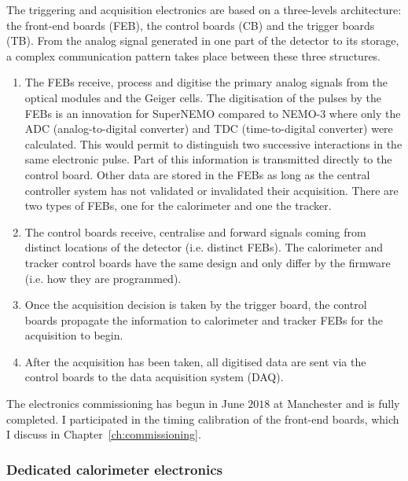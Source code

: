 The triggering and acquisition electronics are based on a three-levels architecture: the front-end boards (FEB), the control boards (CB) and the trigger boards (TB).
From the analog signal generated in one part of the detector to its storage, a complex communication pattern takes place between these three structures.
\begin{enumerate}
\item The FEBs receive, process and digitise the primary analog signals from the optical modules and the Geiger cells.
  The digitisation of the pulses by the FEBs is an innovation for SuperNEMO compared to NEMO-$3$ where only the ADC (analog-to-digital converter) and TDC (time-to-digital converter) were calculated.
  This would permit to distinguish two successive interactions in the same electronic pulse.
  Part of this information is transmitted directly to the control board.
  Other data are stored in the FEBs as long as the central controller system has not validated or invalidated their acquisition.
  There are two types of FEBs, one for the calorimeter and one the tracker.
\item The control boards receive, centralise and forward signals coming from distinct locations of the detector (i.e. distinct FEBs).
  The calorimeter and tracker control boards have the same design and only differ by the firmware (i.e. how they are programmed).
\item Once the acquisition decision is taken by the trigger board, the control boards propagate the information to calorimeter and tracker FEBs for the acquisition to begin.
\item After the acquisition has been taken, all digitised data are sent via the control boards to the data acquisition system (DAQ).
\end{enumerate}
The electronics commissioning has begun in June $2018$ at Manchester and is fully completed.
I participated in the timing calibration of the front-end boards, which I discuss in Chapter~\ref{ch:commissioning}.

\subsubsection*{Dedicated calorimeter electronics}

